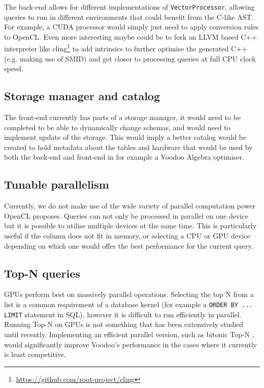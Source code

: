 The back-end allows for different implementations of \texttt{VectorProcessor}, allowing queries to run in different environments that could benefit from the C-like AST. For example, a CUDA processor would simply just need to apply conversion rules to OpenCL. Even more interesting maybe could be to fork an LLVM based C++ interpreter like cling\footnote{\url{https://github.com/root-project/cling}} to add intrinsics to further optimise the generated C++ (e.g. making use of SMID) and get closer to processing queries at full CPU clock speed.

\subsection{Storage manager and catalog}\label{sub:catalog}

The front-end currently has parts of a storage manager, it would need to be completed to be able to dynamically change schemas, and would need to implement update of the storage. This would imply a better catalog would be created to hold metadata about the tables and hardware that would be used by both the back-end and front-end in for example a Voodoo Algebra optimiser.

\subsection{Tunable parallelism}

Currently, we do not make use of the wide variety of parallel computation power OpenCL proposes. Queries can not only be processed in parallel on one device but it is possible to utilise multiple devices at the same time. This is particularly useful if the column does not fit in memory, or selecting a CPU or GPU device depending on which one would offer the best performance for the current query.

\subsection{Top-N queries}
\label{sub:top-n}

GPUs perform best on massively parallel operations. Selecting the top N from a list is a common requirement of a database kernel (for example a \texttt{ORDER BY ... LIMIT} statement in SQL), however it is difficult to run efficiently in parallel. Running Top-N on GPUs is not something that has been extensively studied until recently. Implementing an efficient parallel version, such as bitonic Top-N \cite{Shanbhag:2018:ETQ:3183713.3183735}, would significantly improve Voodoo's performance in the cases where it currently is least competitive.

